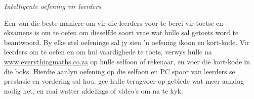 \newpage
\thispagestyle{empty}
{\Large


{\normalfont\sffamily\fontsize{22}\normalfont\itshape Intelligente oefening vir leerders} \par


Een van die beste maniere om vir die leerders voor te berei vir toetse en eksamens is om te oefen om dieselfde soort vrae wat hulle sal getoets word te beantwoord. By elke stel oefeninge sal jy sien 'n oefening ikoon en kort-kode.
Vir leerders om te oefen en om hul vaardighede te toets, verwys hulle na \underline{www.everythingmaths.co.za} op hulle selfoon of rekenaar, en voer die kort-kode in die boks.
Hierdie aanlyn oefening op die selfoon en PC spoor van leerders se prestasie en vordering sal hou, gee hulle terugvoer op gebiede wat meer aandag nodig het, en raai watter afdelings of video's om na te kyk. \par


}
